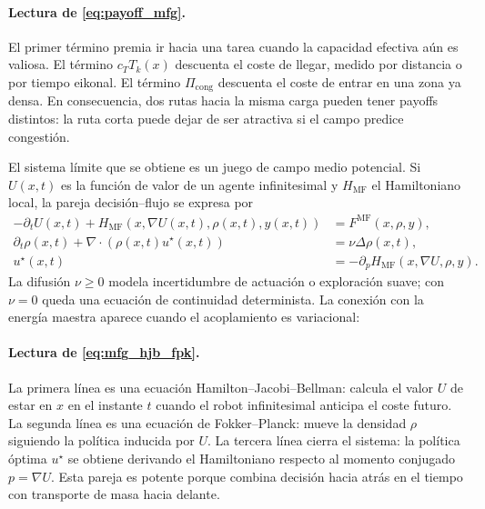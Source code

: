 \paragraph{Lectura de \eqref{eq:payoff_mfg}.}
El primer término premia ir hacia una tarea cuando la capacidad efectiva aún es valiosa.
El término $c_TT_k(x)$ descuenta el coste de llegar, medido por distancia o por tiempo
eikonal. El término $\Pi_{\mathrm{cong}}$ descuenta el coste de entrar en una zona ya
densa. En consecuencia, dos rutas hacia la misma carga pueden tener payoffs distintos:
la ruta corta puede dejar de ser atractiva si el campo predice congestión.

El sistema límite que se obtiene es un juego de campo medio potencial. Si $U(x,t)$ es la
función de valor de un agente infinitesimal y $H_{\mathrm{MF}}$ el Hamiltoniano local,
la pareja decisión--flujo se expresa por
\begin{equation}
\begin{aligned}
  -\partial_t U(x,t)
  +H_{\mathrm{MF}}\!\left(x,\nabla U(x,t),\rho(x,t),y(x,t)\right)
  &=F^{\mathrm{MF}}(x,\rho,y),\\
  \partial_t\rho(x,t)
  +\nabla\!\cdot\!\left(\rho(x,t)u^\star(x,t)\right)
  &=\nu\Delta\rho(x,t),\\
  u^\star(x,t)
  &=-\partial_pH_{\mathrm{MF}}\!\left(x,\nabla U,\rho,y\right).
\end{aligned}
\label{eq:mfg_hjb_fpk}
\end{equation}
La difusión $\nu\ge0$ modela incertidumbre de actuación o exploración suave; con
$\nu=0$ queda una ecuación de continuidad determinista. La conexión con la energía
maestra aparece cuando el acoplamiento es variacional:

\paragraph{Lectura de \eqref{eq:mfg_hjb_fpk}.}
La primera línea es una ecuación Hamilton--Jacobi--Bellman: calcula el valor $U$ de estar
en $x$ en el instante $t$ cuando el robot infinitesimal anticipa el coste futuro. La
segunda línea es una ecuación de Fokker--Planck: mueve la densidad $\rho$ siguiendo la
política inducida por $U$. La tercera línea cierra el sistema: la política óptima
$u^\star$ se obtiene derivando el Hamiltoniano respecto al momento conjugado
$p=\nabla U$. Esta pareja es potente porque combina decisión hacia atrás en el tiempo
con transporte de masa hacia delante.

